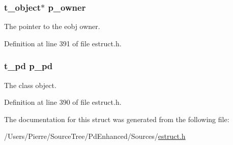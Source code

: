 \hypertarget{struct__eproxy_aafbddf848d70a14ab336be2b19cc535f}{
\subsubsection[{p\-\_\-owner}]{\setlength{\rightskip}{0pt plus 5cm}t\-\_\-object$\ast$ p\-\_\-owner}}\label{struct__eproxy_aafbddf848d70a14ab336be2b19cc535f}
The pointer to the eobj owner. 

Definition at line 391 of file estruct.\-h.

\hypertarget{struct__eproxy_a818a512bafab5b368d1fa0bca9872451}{
\subsubsection[{p\-\_\-pd}]{\setlength{\rightskip}{0pt plus 5cm}t\-\_\-pd p\-\_\-pd}}\label{struct__eproxy_a818a512bafab5b368d1fa0bca9872451}
The class object. 

Definition at line 390 of file estruct.\-h.



The documentation for this struct was generated from the following file\-:\begin{DoxyCompactItemize}
\item 
/\-Users/\-Pierre/\-Source\-Tree/\-Pd\-Enhanced/\-Sources/\hyperlink{estruct_8h}{estruct.\-h}\end{DoxyCompactItemize}
